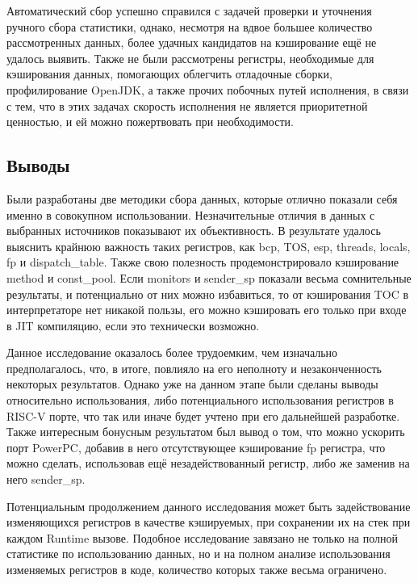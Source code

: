 Автоматический сбор успешно справился с задачей проверки и уточнения ручного сбора статистики, однако, несмотря на вдвое большее количество рассмотренных данных, более удачных кандидатов на кэширование ещё не удалось выявить. Также не были рассмотрены регистры, необходимые для кэширования данных, помогающих облегчить отладочные сборки, профилирование OpenJDK, а также прочих побочных путей исполнения, в связи с тем, что в этих задачах скорость исполнения не является приоритетной ценностью, и ей можно пожертвовать при необходимости. 


\subsection{Выводы}

Были разработаны две методики сбора данных, которые отлично показали себя именно в совокупном использовании. Незначительные отличия в данных с выбранных источников показывают их объективность. В результате удалось выяснить крайнюю важность таких регистров, как bcp, TOS, esp, threads, locals, fp и dispatch\_table. Также свою полезность продемонстрировало кэширование method и const\_pool. Если monitors и sender\_sp показали весьма сомнительные результаты, и потенциально от них можно избавиться, то от кэширования TOC в интерпретаторе нет никакой пользы, его можно кэшировать его только при входе в JIT компиляцию, если это технически возможно.

Данное исследование оказалось более трудоемким, чем изначально предполагалось, что, в итоге, повлияло на его неполноту и незаконченность некоторых результатов. Однако уже на данном этапе были сделаны выводы относительно использования, либо потенциального использования регистров в RISC-V порте, что так или иначе будет учтено при его дальнейшей разработке. Также интересным бонусным результатом был вывод о том, что можно ускорить порт PowerPC, добавив в него отсутствующее кэширование fp регистра, что можно сделать, использовав ещё незадействованный регистр, либо же заменив на него sender\_sp.

Потенциальным продолжением данного исследования может быть задействование изменяющихся регистров в качестве кэшируемых, при сохранении их на стек при каждом Runtime вызове. Подобное исследование завязано не только на полной статистике по использованию данных, но и на полном анализе использования изменяемых регистров в коде, количество которых также весьма ограничено. 
